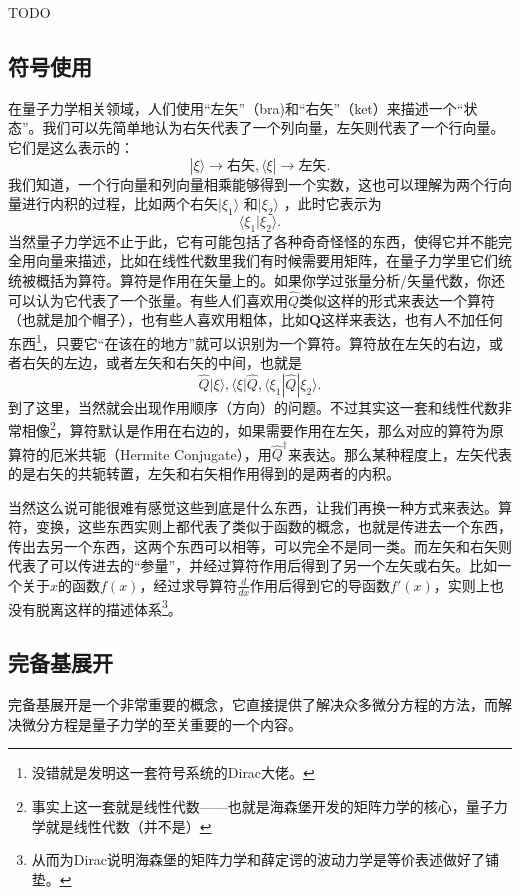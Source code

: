 \documentclass{article}
\numberwithin{equation}{section}
\begin{document}
    TODO
    \subsection{符号使用}
    在量子力学相关领域，人们使用``左矢''（bra)和``右矢''（ket）来描述一个``状态''。我们可以先简单地认为右矢代表了一个列向量，左矢则代表了一个行向量。它们是这么表示的：
    \[
    | \xi \rangle \rightarrow \text{右矢}, \langle \xi | \rightarrow \text{左矢}    
    .\]  
    我们知道，一个行向量和列向量相乘能够得到一个实数，这也可以理解为两个行向量进行内积的过程，比如两个右矢$| \xi_1 \rangle $ 和$| \xi_2 \rangle $ ，此时它表示为
    \[
    \langle \xi_1 | \xi_2 \rangle 
    .\] 
    当然量子力学远不止于此，它有可能包括了各种奇奇怪怪的东西，使得它并不能完全用向量来描述，比如在线性代数里我们有时候需要用矩阵，在量子力学里它们统统被概括为算符。算符是作用在矢量上的。如果你学过张量分析/矢量代数，你还可以认为它代表了一个张量。有些人们喜欢用$\hat{Q}$类似这样的形式来表达一个算符（也就是加个帽子），也有些人喜欢用粗体，比如$\mathbf{Q}$这样来表达，也有人不加任何东西\footnote{没错就是发明这一套符号系统的\Large{Dirac}大佬。}，只要它``在该在的地方''就可以识别为一个算符。算符放在左矢的右边，或者右矢的左边，或者左矢和右矢的中间，也就是
    \[
    \hat{Q}| \xi \rangle ,\langle \xi | \hat{Q}, \langle \xi_1 | \hat{Q} | \xi_2 \rangle   
    .\] 
    到了这里，当然就会出现作用顺序（方向）的问题。不过其实这一套和线性代数非常相像\footnote{事实上这一套就是线性代数——也就是海森堡开发的矩阵力学的核心，量子力学就是线性代数（并不是）}，算符默认是作用在右边的，如果需要作用在左矢，那么对应的算符为原算符的厄米共轭（Hermite Conjugate），用$\hat{Q}^\dagger$来表达。那么某种程度上，左矢代表的是右矢的共轭转置，左矢和右矢相作用得到的是两者的内积。

    当然这么说可能很难有感觉这些到底是什么东西，让我们再换一种方式来表达。算符，变换，这些东西实则上都代表了类似于函数的概念，也就是传进去一个东西，传出去另一个东西，这两个东西可以相等，可以完全不是同一类。而左矢和右矢则代表了可以传进去的``参量''，并经过算符作用后得到了另一个左矢或右矢。比如一个关于$x$的函数$f(x)$，经过求导算符$\frac{d }{d x} $作用后得到它的导函数$f'(x)$，实则上也没有脱离这样的描述体系\footnote{从而为Dirac说明海森堡的矩阵力学和薛定谔的波动力学是等价表述做好了铺垫。}。

    \subsection{完备基展开}
    完备基展开是一个非常重要的概念，它直接提供了解决众多微分方程的方法，而解决微分方程是量子力学的至关重要的一个内容。
\end{document}
